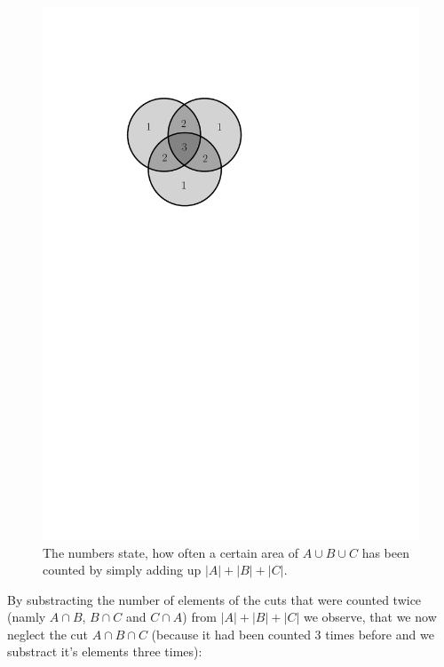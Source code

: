 \begin{figure}[htb]
	\centering
	\includegraphics[scale=.5]{02_higher_combinatorics/pics/a_cut_b_cut_c.pdf}
	\caption{The numbers state, how often a certain area of $A \cup B \cup C$ has been counted by simply adding up $|A| + |B| + |C|$.}
\end{figure}

By substracting the number of elements of the cuts that were counted twice (namly $A \cap B$, $B \cap C$ and $C \cap A$) from $|A| + |B| + |C|$
we observe, that we now neglect the cut $A \cap B \cap C$ (because it had been counted 3 times before and we substract it's elements three times):

